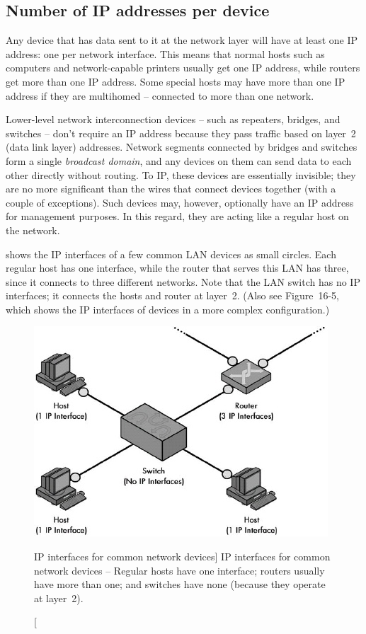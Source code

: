 \subsection{Number of IP addresses per device}

Any device that has data sent to it at the network layer will have at
least one IP address: one per network interface. This means that normal
hosts such as computers and network-capable printers usually get one IP
address, while routers get more than one IP address. Some special hosts
may have more than one IP address if they are multihomed -- connected to more than one network.

Lower-level network interconnection devices -- such as repeaters,
bridges, and switches -- don't require an IP address because they pass
traffic based on layer~2 (data link layer) addresses. Network segments
connected by bridges and switches form a single \emph{broadcast domain}, and any devices on them can send data to each other directly without routing.
To IP, these devices are essentially invisible; they are no
more significant than the wires that connect devices together (with a
couple of exceptions). Such devices may, however, optionally have an IP
address for management purposes. In this regard, they are acting like a
regular host on the network.

 shows the IP interfaces of a few common LAN devices as small circles.
Each regular host has one interface, while the router that serves this LAN has three, since it connects to three different networks.
Note that the LAN switch has no IP interfaces; it connects the hosts and router at layer~2.
(Also see Figure~16-5, which shows the IP interfaces of devices in a more complex configuration.)


\begin{figure}
   \centering
   \includegraphics[width=.6\textwidth]{images/ip-interfaces.jpg}
   \caption
      [IP interfaces for common network devices]
      {IP interfaces for common network devices --
      Regular hosts have one interface; routers usually have more than one;
      and switches have none (because they operate at layer~2).}
   \label{fig:ip-interfaces}
\end{figure}



